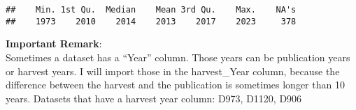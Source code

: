 \documentclass[
]{article}
\newenvironment{Shaded}{\begin{snugshade}}{\end{snugshade}}
\newcommand{\FunctionTok}[1]{\textcolor[rgb]{0.13,0.29,0.53}{\textbf{#1}}}
\newcommand{\NormalTok}[1]{#1}
\newcommand{\SpecialCharTok}[1]{\textcolor[rgb]{0.81,0.36,0.00}{\textbf{#1}}}
\begin{document}
\begin{Shaded}
\end{Shaded}

\begin{verbatim}
##    Min. 1st Qu.  Median    Mean 3rd Qu.    Max.    NA's 
##    1973    2010    2014    2013    2017    2023     378
\end{verbatim}

\textbf{Important Remark}:\\
Sometimes a dataset has a ``Year'' column. Those years can be
publication years or harvest years. I will import those in the
harvest\_Year column, because the difference between the harvest and the
publication is sometimes longer than 10 years. Datasets that have a
harvest year column: D973, D1120, D906
\end{document}
